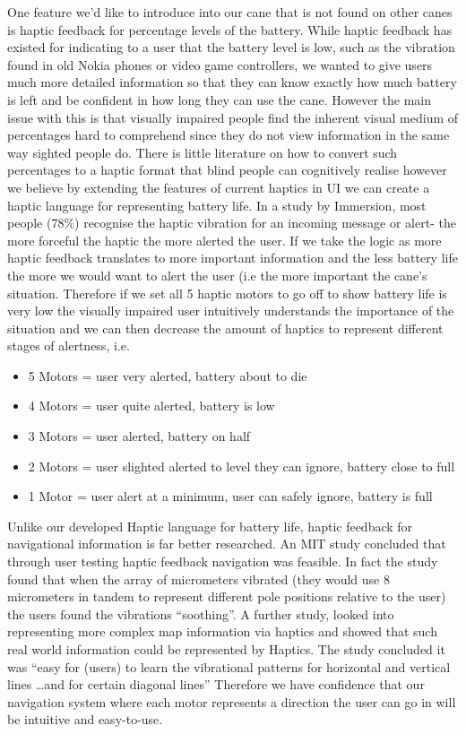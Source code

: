 \documentclass{article}
\begin{document}
One feature we’d like to introduce into our cane that is not found on other canes is haptic feedback for percentage levels of the battery. While haptic feedback has existed for indicating to a user that the battery level is low, such as the vibration found in old Nokia phones or video game controllers, we wanted to give users  much more detailed information so that they can know exactly how much battery is left and be confident in how long they can use the cane. However the main issue with this is that visually impaired people find the inherent visual medium of percentages hard to comprehend since they do not view information in the same way sighted people do. \cite{7wolchover} There is little literature on how to convert such percentages to a haptic format that blind people can cognitively realise however we believe by extending the features of current haptics in UI we can create a haptic language for representing battery life. In a study by Immersion, most people (78\%) recognise the haptic vibration for an incoming message or alert- the more forceful the haptic the more alerted the user. \cite{8immersion} If we take the logic as more haptic feedback translates to more important information and the less battery life the more we would want to alert the user (i.e the more important the cane’s situation. Therefore if we set all 5 haptic motors to go off to show battery life is very low the  visually impaired user intuitively understands the importance of the situation and we can then decrease the amount of haptics to represent different stages of alertness, i.e.

\begin{itemize}
    \item 5 Motors = user very alerted, battery about to die
    \item 4 Motors = user quite alerted, battery is low
    \item 3 Motors = user alerted, battery on half
    \item 2 Motors = user slighted alerted to level they can ignore, battery close to full
    \item 1 Motor = user alert at a minimum, user can safely ignore, battery is full
\end{itemize}

Unlike our developed Haptic language for battery life, haptic feedback for navigational information is far better researched. An MIT study concluded that through user testing haptic feedback navigation was feasible. \cite{9ertan} In fact the study found that when the array of micrometers vibrated (they would use 8 micrometers in tandem to represent different pole positions relative to the user) the users found the vibrations “soothing”. A further study, looked into representing more complex map information via haptics and showed that such real world information could be represented by Haptics. The study concluded it was “easy for (users) to learn the vibrational patterns for horizontal and vertical lines \dots and for certain diagonal lines” Therefore we have confidence that our navigation system where each motor represents a direction the user can go in will be intuitive and easy-to-use. \cite{10grussenmeyer}
 
\end{document}
